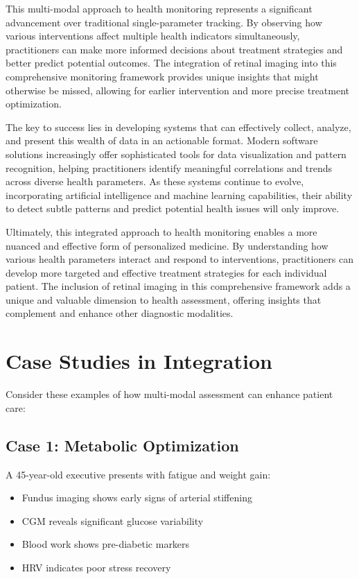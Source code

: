\documentclass[
  Letterpaper,
]{scrbook}
\providecommand{\tightlist}{%
  \setlength{\itemsep}{0pt}\setlength{\parskip}{0pt}}\usepackage{longtable,booktabs,array}
\begin{document}
This multi-modal approach to health monitoring represents a significant
advancement over traditional single-parameter tracking. By observing how
various interventions affect multiple health indicators simultaneously,
practitioners can make more informed decisions about treatment
strategies and better predict potential outcomes. The integration of
retinal imaging into this comprehensive monitoring framework provides
unique insights that might otherwise be missed, allowing for earlier
intervention and more precise treatment optimization.

The key to success lies in developing systems that can effectively
collect, analyze, and present this wealth of data in an actionable
format. Modern software solutions increasingly offer sophisticated tools
for data visualization and pattern recognition, helping practitioners
identify meaningful correlations and trends across diverse health
parameters. As these systems continue to evolve, incorporating
artificial intelligence and machine learning capabilities, their ability
to detect subtle patterns and predict potential health issues will only
improve.

Ultimately, this integrated approach to health monitoring enables a more
nuanced and effective form of personalized medicine. By understanding
how various health parameters interact and respond to interventions,
practitioners can develop more targeted and effective treatment
strategies for each individual patient. The inclusion of retinal imaging
in this comprehensive framework adds a unique and valuable dimension to
health assessment, offering insights that complement and enhance other
diagnostic modalities.

\section{Case Studies in Integration}\label{case-studies-in-integration}

Consider these examples of how multi-modal assessment can enhance
patient care:

\subsection{Case 1: Metabolic
Optimization}\label{case-1-metabolic-optimization}

A 45-year-old executive presents with fatigue and weight gain:

\begin{itemize}
\tightlist
\item
  Fundus imaging shows early signs of arterial stiffening
\item
  CGM reveals significant glucose variability
\item
  Blood work shows pre-diabetic markers
\item
  HRV indicates poor stress recovery
\end{itemize}
\end{document}

